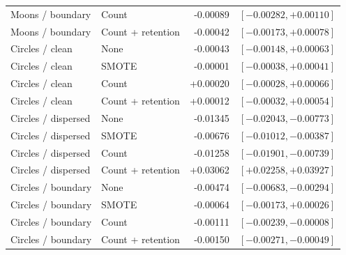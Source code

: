 \begin{table}[htbp]
\begin{tabular}{llrr}
Moons / boundary & Count & -0.00089 & $[-0.00282, +0.00110]$ \\
Moons / boundary & Count + retention & -0.00042 & $[-0.00173, +0.00078]$ \\
Circles / clean & None & -0.00043 & $[-0.00148, +0.00063]$ \\
Circles / clean & SMOTE & -0.00001 & $[-0.00038, +0.00041]$ \\
Circles / clean & Count & +0.00020 & $[-0.00028, +0.00066]$ \\
Circles / clean & Count + retention & +0.00012 & $[-0.00032, +0.00054]$ \\
Circles / dispersed & None & -0.01345 & $[-0.02043, -0.00773]$ \\
Circles / dispersed & SMOTE & -0.00676 & $[-0.01012, -0.00387]$ \\
Circles / dispersed & Count & -0.01258 & $[-0.01901, -0.00739]$ \\
Circles / dispersed & Count + retention & +0.03062 & $[+0.02258, +0.03927]$ \\
Circles / boundary & None & -0.00474 & $[-0.00683, -0.00294]$ \\
Circles / boundary & SMOTE & -0.00064 & $[-0.00173, +0.00026]$ \\
Circles / boundary & Count & -0.00111 & $[-0.00239, -0.00008]$ \\
Circles / boundary & Count + retention & -0.00150 & $[-0.00271, -0.00049]$ \\
\hline
\end{tabular}
\end{table}
\clearpage
